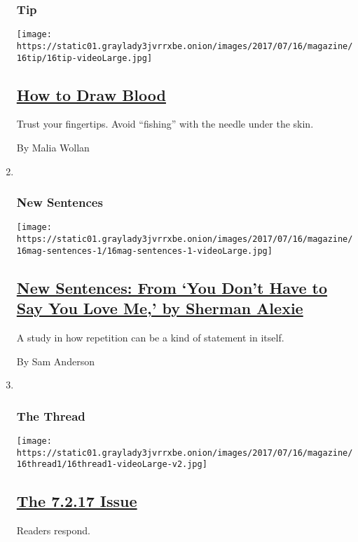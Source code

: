 \begin{enumerate}
{  \subsubsection{Tip}\label{tip}}

  \texttt{[image: https://static01.graylady3jvrrxbe.onion/images/2017/07/16/magazine/16tip/16tip-videoLarge.jpg]}

  \hypertarget{how-to-draw-blood}{%
  \subsection{\texorpdfstring{\href{/2017/07/14/magazine/how-to-draw-blood.html}{How
  to Draw Blood}}{How to Draw Blood}}\label{how-to-draw-blood}}

  Trust your fingertips. Avoid ``fishing'' with the needle under the
  skin.

  By Malia Wollan
\item ~
  \hypertarget{new-sentences}{%
  \subsubsection{New Sentences}\label{new-sentences}}

  \texttt{[image: https://static01.graylady3jvrrxbe.onion/images/2017/07/16/magazine/16mag-sentences-1/16mag-sentences-1-videoLarge.jpg]}

  \hypertarget{new-sentences-from-you-dont-have-to-say-you-love-me-by-sherman-alexie}{%
  \subsection{\texorpdfstring{\href{/2017/07/14/magazine/new-sentences-from-you-dont-have-to-say-you-love-me-by-sherman-alexie.html}{New
  Sentences: From `You Don't Have to Say You Love Me,' by Sherman
  Alexie}}{New Sentences: From `You Don't Have to Say You Love Me,' by Sherman Alexie}}\label{new-sentences-from-you-dont-have-to-say-you-love-me-by-sherman-alexie}}

  A study in how repetition can be a kind of statement in itself.

  By Sam Anderson
\item ~
  \hypertarget{the-thread}{%
  \subsubsection{The Thread}\label{the-thread}}

  \texttt{[image: https://static01.graylady3jvrrxbe.onion/images/2017/07/16/magazine/16thread1/16thread1-videoLarge-v2.jpg]}

  \hypertarget{the-7217-issue}{%
  \subsection{\texorpdfstring{\href{/2017/07/14/magazine/the-7-217-issue.html}{The
  7.2.17 Issue}}{The 7.2.17 Issue}}\label{the-7217-issue}}

  Readers respond.
\end{enumerate}


